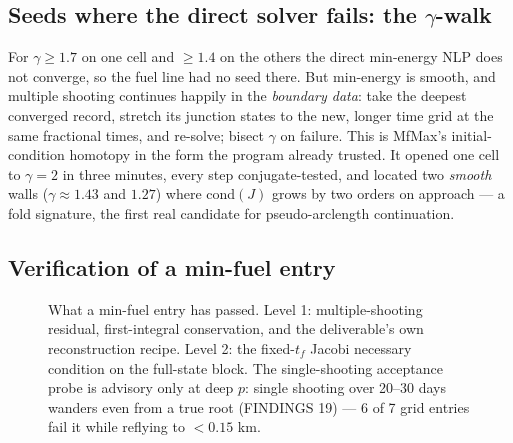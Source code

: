 \documentclass[11pt]{article}
\newcommand{\tf}{t_f}\newcommand{\R}{\mathbb{R}}
\begin{document}
\subsection{Seeds where the direct solver fails: the $\gamma$-walk}
\begin{intu}
For $\gamma\ge1.7$ on one cell and $\ge1.4$ on the others the direct
min-energy NLP does not converge, so the fuel line had no seed there. But
min-energy is smooth, and multiple shooting continues happily in the
\emph{boundary data}: take the deepest converged record, stretch its junction
states to the new, longer time grid at the same fractional times, and re-solve;
bisect $\gamma$ on failure. This is MfMax's initial-condition homotopy in the
form the program already trusted. It opened one cell to $\gamma=2$ in three
minutes, every step conjugate-tested, and located two \emph{smooth} walls
($\gamma\approx1.43$ and $1.27$) where cond$(J)$ grows by two orders on approach
--- a fold signature, the first real candidate for pseudo-arclength continuation.
\end{intu}

\subsection{Verification of a min-fuel entry}
\begin{figure}[t]\centering
{}
\caption{What a min-fuel entry has passed. Level 1: multiple-shooting residual, first-integral conservation, and the deliverable's own reconstruction recipe. Level 2: the fixed-$\tf$ Jacobi necessary condition on the full-state block. The single-shooting acceptance probe is advisory only at deep $p$: single shooting over 20--30 days wanders even from a true root (FINDINGS 19) --- 6 of 7 grid entries fail it while reflying to $<0.15$ km.}
\label{fig:mf-verify}
\end{figure}
\end{document}
